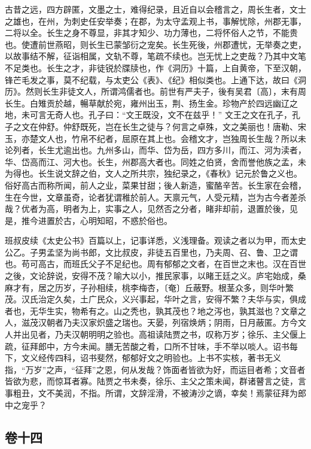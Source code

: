 \documentclass[]{article}
\begin{document}
古昔之远，四方辟匿，文墨之士，难得纪录，且近自以会稽言之，周长生者，文士之雄也，在州，为刺史任安举奏；在郡，为太守孟观上书，事解忧除，州郡无事，二将以全。长生之身不尊显，非其才知少、功力薄也，二将怀俗人之节，不能贵也。使遭前世燕昭，则长生已蒙邹衍之宠矣。长生死後，州郡遭忧，无举奏之吏，以故事结不解，征诣相属，文轨不尊，笔疏不续也。岂无忧上之吏哉？乃其中文笔不足类也。长生之才，非徒锐於牒牍也，作《洞历》十篇，上自黄帝，下至汉朝，锋芒毛发之事，莫不纪载，与太吏公《表》、《纪》相似类也。上通下达，故曰《洞历》。然则长生非徒文人，所谓鸿儒者也。前世有严夫子，後有吴君〔高〕，末有周长生。白雉贡於越，暢草献於宛，雍州出玉，荆、扬生金。珍物产於四远幽辽之地，未可言无奇人也。孔子曰：``文王既没，文不在兹乎！''
文王之文在孔子，孔子之文在仲舒。仲舒既死，岂在长生之徒与？何言之卓殊，文之美丽也！唐勒、宋玉，亦楚文人也，竹帛不纪者，屈原在其上也。会稽文才，岂独周长生哉？所以未论列者，长生尤逾出也。九州多山，而华、岱为岳，四方多川，而江、河为渎者，华、岱高而江、河大也。长生，州郡高大者也。同姓之伯贤，舍而誉他族之孟，未为得也。长生说文辞之伯，文人之所共宗，独纪录之，《春秋》记元於鲁之义也。俗好高古而称所闻，前人之业，菜果甘甜；後人新造，蜜酪辛苦。长生家在会稽，生在今世，文章虽奇，论者犹谓稚於前人。天禀元气，人受元精，岂为古今者差杀哉？优者为高，明者为上，实事之人，见然否之分者，睹非却前，退置於後，见是，推今进置於古，心明知昭，不惑於俗也。

班叔皮续《太史公书》百篇以上，记事详悉，义浅理备。观读之者以为甲，而太史公乙。子男孟坚为尚书郎，文比叔皮，非徒五百里也，乃夫周、召、鲁、卫之谓也。苟可高古，而班氏父子不足纪也。周有郁郁之文者，在百世之末也。汉在百世之後，文论辞说，安得不茂？喻大以小，推民家事，以睹王廷之义。庐宅始成，桑麻才有，居之历岁，子孙相续，桃李梅杏，〔奄〕丘蔽野。根茎众多，则华叶繁茂。汉氏治定久矣，土广民众，义兴事起，华叶之言，安得不繁？夫华与实，俱成者也，无华生实，物希有之。山之秃也，孰其茂也？地之泻也，孰其滋也？文章之人，滋茂汉朝者乃夫汉家炽盛之瑞也。天晏，列宿焕炳；阴雨，日月蔽匿。方今文人并出见者，乃夫汉朝明明之验也。高祖读陆贾之书，叹称万岁；徐乐、主父偃上疏，征拜郎中，方今未闻。膳无苦酸之肴，口所不甘味，手不举以啖人。诏书每下，文义经传四科，诏书斐然，郁郁好文之明验也。上书不实核，著书无义指，``万岁''之声，``征拜''之恩，何从发哉？饰面者皆欲为好，而运目者希；文音者皆欲为悲，而惊耳者寡。陆贾之书未奏，徐乐、主父之策未闻，群诸瞽言之徒，言事粗丑，文不美润，不指。所谓，文辞淫滑，不被涛沙之谪，幸矣！焉蒙征拜为郎中之宠乎？

\hypertarget{header-n584}{%
\subsection{卷十四}\label{header-n584}}
\end{document}
